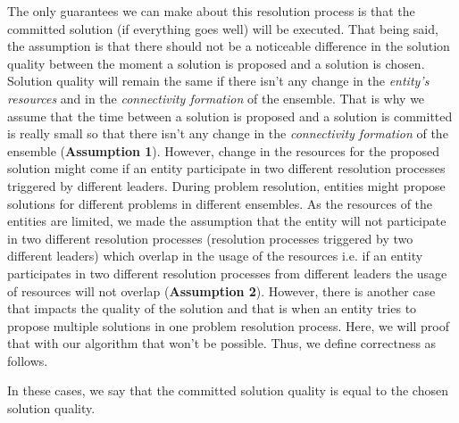 \documentclass[journal]{IEEEtran}
\theoremstyle{definition}
\begin{document}
The only guarantees we can make about this resolution process is that the committed solution (if everything goes well) will be executed. That being said, the assumption is that there should not be a noticeable difference in the solution quality between the moment a solution is proposed and a solution is chosen. Solution quality will remain the same if there isn't any change in the \textit{entity's resources} and in the \textit{connectivity formation} of the ensemble.
That is why we assume that the time between a solution is proposed and a solution is committed is really small so that there isn't any change in the \textit{connectivity formation} of the ensemble (\textbf{Assumption 1}).
However, change in the resources for the proposed solution might come if an entity participate in two different resolution processes triggered by different leaders. During problem resolution, entities might propose solutions for different problems in different ensembles. As the resources of the entities are limited, we made the assumption that
the entity will not participate in two different resolution processes (resolution processes triggered by two different leaders) which overlap in the usage of the resources i.e. 
if an entity participates in two different resolution processes from different leaders the usage of resources will not overlap (\textbf{Assumption 2}). 
However, there is another case that impacts the quality of the solution and that is when an entity tries to propose multiple solutions in one problem resolution process. Here, we will proof that with our algorithm that won't be possible. 
Thus, we define correctness as follows.

In these cases, we say that the committed solution quality is equal to the chosen solution quality. 



\end{document}
